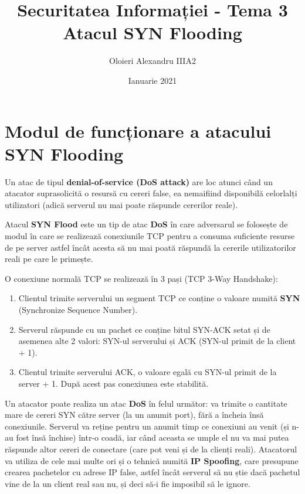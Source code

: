 \documentclass[a4paper]{article}
\title{Securitatea Informației - Tema 3\\
        Atacul SYN Flooding}
\author{Oloieri Alexandru IIIA2}
\date{Ianuarie 2021}
\begin{document}
\maketitle

\section{Modul de funcționare a atacului SYN Flooding}

Un atac de tipul \textbf{denial-of-service (DoS attack)} are loc atunci când un atacator suprasolicită o resursă cu cereri false, ea nemaifiind disponibilă celorlalți utilizatori (adică serverul nu mai poate răspunde cererilor reale).

Atacul \textbf{SYN Flood} este un tip de atac \textbf{DoS} în care adversarul se folosește de modul în care se realizează conexiunile TCP pentru a consuma suficiente resurse de pe server astfel încât acesta să nu mai poată răspundă la cererile utilizatorilor reali pe care le primește.

O conexiune normală TCP se realizează în 3 pași (TCP 3-Way Handshake):

\begin{enumerate}
    \item Clientul trimite serverului un segment TCP ce conține o valoare numită \textbf{SYN} (Synchronize Sequence Number).
    
    \item Serverul răspunde cu un pachet ce conține bitul SYN-ACK setat și de asemenea alte 2 valori: SYN-ul serverului și ACK (SYN-ul primit de la client + 1).
    
    \item Clientul trimite serverului ACK, o valoare egală cu SYN-ul primit de la server + 1. După acest pas conexiunea este stabilită.
    
\end{enumerate}

Un atacator poate realiza un atac \textbf{DoS} în felul următor: va trimite o cantitate mare de cereri SYN către server (la un anumit port), fără a încheia însă conexiunile. Serverul va reține pentru un anumit timp ce conexiuni au venit (și n-au fost însă închise) într-o coadă, iar când aceasta se umple el nu va mai putea răspunde altor cereri de conectare (care pot veni și de la clienți reali). Atacatorul va utiliza de cele mai multe ori și o tehnică numită \textbf{IP Spoofing}, care presupune crearea pachetelor cu adrese IP false, astfel încât serverul să nu știe dacă pachetul vine de la un client real sau nu, și deci să-i fie imposibil să le ignore.
\end{document}
